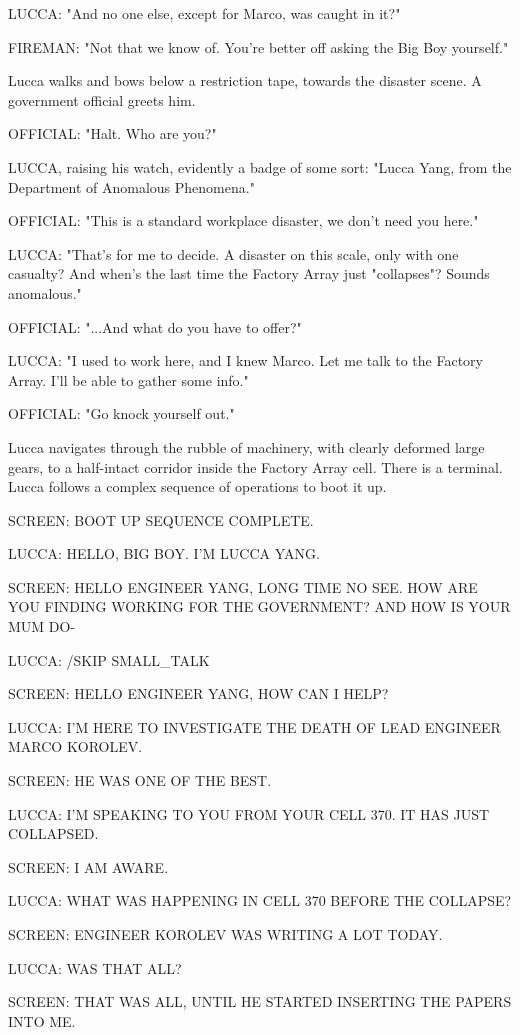 \documentclass[11pt]{article}
\begin{document}
LUCCA: "And no one else, except for Marco, was caught in it?"

FIREMAN: "Not that we know of. You're better off asking the Big Boy yourself."

Lucca walks and bows below a restriction tape, towards the disaster scene. A government official greets him.

OFFICIAL: "Halt. Who are you?"

LUCCA, raising his watch, evidently a badge of some sort: "Lucca Yang, from the Department of Anomalous Phenomena."

OFFICIAL: "This is a standard workplace disaster, we don't need you here."

LUCCA: "That's for me to decide. A disaster on this scale, only with one casualty? And when's the last time the Factory Array just "collapses"? Sounds anomalous."

OFFICIAL: "...And what do you have to offer?"

LUCCA: "I used to work here, and I knew Marco. Let me talk to the Factory Array. I'll be able to gather some info."

OFFICIAL: "Go knock yourself out."

Lucca navigates through the rubble of machinery, with clearly deformed large gears, to a half-intact corridor inside the Factory Array cell. There is a terminal. Lucca follows a complex sequence of operations to boot it up. 

SCREEN: BOOT UP SEQUENCE COMPLETE.

LUCCA: HELLO, BIG BOY. I'M LUCCA YANG.

SCREEN: HELLO ENGINEER YANG, LONG TIME NO SEE. HOW ARE YOU FINDING WORKING FOR THE GOVERNMENT? AND HOW IS YOUR MUM DO-

LUCCA: \@/SKIP SMALL\_TALK

SCREEN: HELLO ENGINEER YANG, HOW CAN I HELP?

LUCCA: I'M HERE TO INVESTIGATE THE DEATH OF LEAD ENGINEER MARCO KOROLEV. 

SCREEN: HE WAS ONE OF THE BEST.

LUCCA: I'M SPEAKING TO YOU FROM YOUR CELL 370. IT HAS JUST COLLAPSED.

SCREEN: I AM AWARE.

LUCCA: WHAT WAS HAPPENING IN CELL 370 BEFORE THE COLLAPSE?

SCREEN: ENGINEER KOROLEV WAS WRITING A LOT TODAY. 

LUCCA: WAS THAT ALL?

SCREEN: THAT WAS ALL, UNTIL HE STARTED INSERTING THE PAPERS INTO ME.
\end{document}
